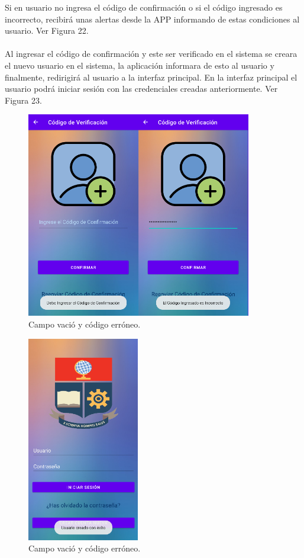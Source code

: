 \documentclass[a4paper,10pt, oneside, titlepage]{article}
\begin{document}
	Si en usuario no ingresa el código de confirmación o si el código ingresado es incorrecto, recibirá unas alertas desde la APP informando de estas condiciones al usuario. Ver Figura 22.\\\\
	Al ingresar el código de confirmación y este ser verificado en el sistema se creara el nuevo usuario en el sistema, la aplicación informara de esto al usuario y finalmente, redirigirá al usuario a la interfaz principal. En la interfaz principal el usuario podrá iniciar sesión con las credenciales creadas anteriormente. Ver Figura 23.
	\begin{figure}[!ht]
		\centering
		\includegraphics[width = .75\linewidth, height = 9cm]{22.png}
		\caption{Campo vació y código erróneo.}
	\end{figure}
	\begin{figure}[!ht]
		\centering
		\includegraphics[width = .4\linewidth, height = 9cm]{23.png}
		\caption{Campo vació y código erróneo.}
	\end{figure}
		
\end{document}
